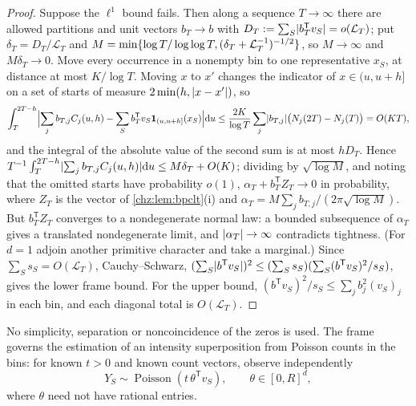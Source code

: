\begin{proof}
Suppose the $\ell^1$ bound fails. Then along a sequence $T\to\infty$ there are allowed partitions and unit vectors
$b_T\to b$ with $D_T:=\sum_S\lvert b_T^{\mathsf T}v_S\rvert=o(\mathcal L_T)$; put $\delta_T=D_T/\mathcal L_T$ and
$M=\min\{\log T/\log\log T,(\delta_T+\mathcal L_T^{-1})^{-1/2}\}$, so $M\to\infty$ and $M\delta_T\to0$. Move every
occurrence in a nonempty bin to one representative $x_S$, at distance at most $K/\log T$. Moving $x$ to $x'$ changes the
indicator of $x\in(u,u+h]$ on a set of starts of measure $2\min(h,\lvert x-x'\rvert)$, so
\[
 \int_T^{2T-h}\Bigl\lvert\sum_jb_{T,j}C_j(u,h)-\sum_Sb_T^{\mathsf T}v_S\mathbf 1_{(u,u+h]}(x_S)\Bigr\rvert\mathrm{d} u
 \le\frac{2K}{\log T}\sum_j\lvert b_{T,j}\rvert\bigl(N_j(2T)-N_j(T)\bigr)=O(KT),
\]
and the integral of the absolute value of the second sum is at most $hD_T$. Hence
$T^{-1}\int_T^{2T-h}\lvert\sum_jb_{T,j}C_j(u,h)\rvert\mathrm{d} u\le M\delta_T+O(K)$; dividing by $\sqrt{\log M}$, and noting that the
omitted starts have probability $o(1)$,
$\alpha_T+b_T^{\mathsf T}Z_T\to0$ in probability, where $Z_T$ is the vector of \cref{chz:lem:bpclt}(i) and
$\alpha_T=M\sum_jb_{T,j}/(2\pi\sqrt{\log M})$. But $b_T^{\mathsf T}Z_T$ converges to a nondegenerate normal law: a bounded
subsequence of $\alpha_T$ gives a translated nondegenerate limit, and $\lvert\alpha_T\rvert\to\infty$ contradicts tightness. (For
$d=1$ adjoin another primitive character and take a marginal.) Since $\sum_Ss_S=O(\mathcal L_T)$, Cauchy--Schwarz,
$(\sum_S\lvert b^{\mathsf T}v_S\rvert)^2\le(\sum_Ss_S)(\sum_S(b^{\mathsf T}v_S)^2/s_S)$, gives the lower frame bound. For the upper bound,
$(b^{\mathsf T}v_S)^2/s_S\le\sum_jb_j^2(v_S)_j$ in each bin, and each diagonal total is $O(\mathcal L_T)$.
\end{proof}

No simplicity, separation or noncoincidence of the zeros is used. The frame governs the estimation of an
intensity superposition from Poisson counts in the bins: for known $t>0$ and known count vectors, observe
independently
\begin{equation}\label{chz:eq:poissonmix}
 Y_S\sim\operatorname{Poisson}(t\,\theta^{\mathsf T}v_S),\qquad\theta\in[0,R]^d ,
\end{equation}
where $\theta$ need not have rational entries.

